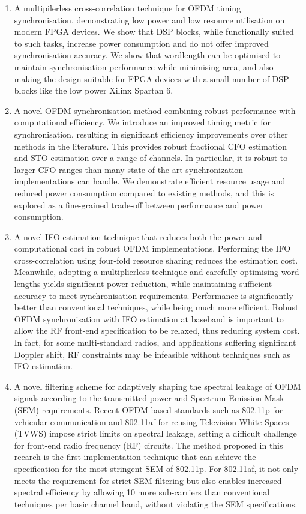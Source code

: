 \begin{enumerate}
\item A multipilerless cross-correlation technique for OFDM timing synchronisation, demonstrating low power and low resource utilisation on modern FPGA devices.
We show that DSP blocks, while functionally suited to such tasks, increase power consumption and do not offer improved synchronisation accuracy.
We show that wordlength can be optimised to maintain synchronisation performance while minimising area, and also making the design suitable for FPGA devices with a small number of DSP blocks like the low power Xilinx Spartan 6.

\item A novel OFDM synchronisation method combining robust performance with computational efficiency.
We introduce an improved timing metric for synchronisation, resulting in significant efficiency improvements over other methods in the literature.
This provides robust fractional CFO estimation and STO estimation over a range of channels.
In particular, it is robust to larger CFO ranges than many state-of-the-art synchronization implementations can handle.
We demonstrate efficient resource usage and reduced power consumption compared to existing methods, and this is explored as a fine-grained trade-off between performance and power consumption.

\item A novel IFO estimation technique that reduces both the power and computational cost in robust OFDM implementations.
Performing the IFO cross-correlation using four-fold resource sharing reduces the estimation cost. Meanwhile, adopting a multiplierless technique and carefully optimising word lengths yields significant power reduction, while maintaining sufficient accuracy to meet synchronisation requirements.
Performance is significantly better than conventional techniques, while being much more efficient.
Robust OFDM synchronisation with IFO estimation at baseband is important to allow the RF front-end specification to be relaxed, thus reducing system cost.
In fact, for some multi-standard radios, and applications suffering significant Doppler shift, RF constraints may be infeasible without techniques such as IFO estimation.

\item A novel filtering scheme for adaptively shaping the spectral leakage of OFDM signals according to the transmitted power and Spectrum Emission Mask (SEM) requirements.
Recent OFDM-based standards such as 802.11p for vehicular communication and 802.11af for reusing Television White Spaces (TVWS) impose strict limits on spectral leakage, setting a difficult challenge for front-end radio frequency (RF) circuits.
The method proposed in this reearch is the first implementation technique that can achieve the specification for the most stringent SEM of 802.11p.
For 802.11af, it not only meets the requirement for strict SEM filtering but also enables increased spectral efficiency by allowing 10 more sub-carriers than conventional techniques per basic channel band, without violating the SEM specifications.


\end{enumerate}
